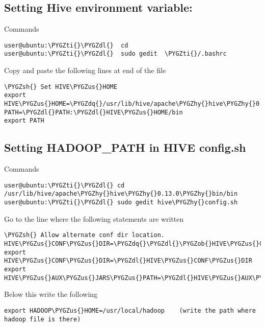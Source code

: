 \documentclass[letterpaper,10pt,english]{sphinxmanual}
\def\PYGZus{\char`\_}
\def\PYGZob{\char`\{}
\def\PYGZsh{\char`\#}
\def\PYGZdl{\char`\$}
\def\PYGZhy{\char`\-}
\def\PYGZdq{\char`\"}
\def\PYGZti{\char`\~}
\begin{document}
\subsection{Setting Hive environment variable:}
\label{hive:setting-hive-environment-variable}
Commands

\begin{Verbatim}[commandchars=\\\{\}]
user@ubuntu:\PYGZti{}\PYGZdl{}  cd
user@ubuntu:\PYGZti{}\PYGZdl{}  sudo gedit  \PYGZti{}/.bashrc
\end{Verbatim}

Copy and paste the following lines at end of the file

\begin{Verbatim}[commandchars=\\\{\}]
\PYGZsh{} Set HIVE\PYGZus{}HOME
export HIVE\PYGZus{}HOME=\PYGZdq{}/usr/lib/hive/apache\PYGZhy{}hive\PYGZhy{}0.13.0\PYGZhy{}bin\PYGZdq{}
PATH=\PYGZdl{}PATH:\PYGZdl{}HIVE\PYGZus{}HOME/bin
export PATH
\end{Verbatim}


\subsection{Setting HADOOP\_PATH in HIVE config.sh}
\label{hive:setting-hadoop-path-in-hive-config-sh}
Commands

\begin{Verbatim}[commandchars=\\\{\}]
user@ubuntu:\PYGZti{}\PYGZdl{} cd  /usr/lib/hive/apache\PYGZhy{}hive\PYGZhy{}0.13.0\PYGZhy{}bin/bin
user@ubuntu:\PYGZti{}\PYGZdl{} sudo gedit hive\PYGZhy{}config.sh
\end{Verbatim}

Go to the line where the following statements are written

\begin{Verbatim}[commandchars=\\\{\}]
\PYGZsh{} Allow alternate conf dir location.
HIVE\PYGZus{}CONF\PYGZus{}DIR=\PYGZdq{}\PYGZdl{}\PYGZob{}HIVE\PYGZus{}CONF\PYGZus{}DIR:\PYGZhy{}\PYGZdl{}HIVE\PYGZus{}HOME/conf\PYGZdq{}
export HIVE\PYGZus{}CONF\PYGZus{}DIR=\PYGZdl{}HIVE\PYGZus{}CONF\PYGZus{}DIR
export HIVE\PYGZus{}AUX\PYGZus{}JARS\PYGZus{}PATH=\PYGZdl{}HIVE\PYGZus{}AUX\PYGZus{}JARS\PYGZus{}PATH
\end{Verbatim}

Below this write the following

\begin{Verbatim}[commandchars=\\\{\}]
export HADOOP\PYGZus{}HOME=/usr/local/hadoop    (write the path where hadoop file is there)
\end{Verbatim}
\end{document}
